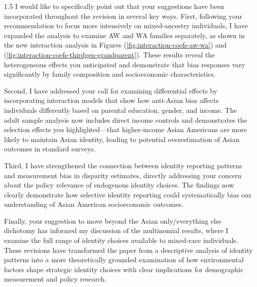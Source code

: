 \documentclass[12pt,english]{article}
\newcommand{\rrxspc}{1.5}
\begin{document}
\begin{refsection}
\begin{spacing}{\rrxspc}
        I would like to specifically point out that your suggestions have been incorporated throughout the revision in several key ways. First, following your recommendation to focus more intensively on mixed-ancestry individuals, I have expanded the analysis to examine AW and WA families separately, as shown in the new interaction analysis in Figures (\ref{fig:interaction-coefs-aw-wa}) and (\ref{fig:interaction-coefs-thirdgen-grandparent}). These results reveal the heterogeneous effects you anticipated and demonstrate that bias responses vary significantly by family composition and socioeconomic characteristics.
        
        Second, I have addressed your call for examining differential effects by incorporating interaction models that show how anti-Asian bias affects individuals differently based on parental education, gender, and income. The adult sample analysis now includes direct income controls and demonstrates the selection effects you highlighted—that higher-income Asian Americans are more likely to maintain Asian identity, leading to potential overestimation of Asian outcomes in standard surveys.
        
        Third, I have strengthened the connection between identity reporting patterns and measurement bias in disparity estimates, directly addressing your concern about the policy relevance of endogenous identity choices. The findings now clearly demonstrate how selective identity reporting could systematically bias our understanding of Asian American socioeconomic outcomes.
        
        Finally, your suggestion to move beyond the Asian only/everything else dichotomy has informed my discussion of the multinomial results, where I examine the full range of identity choices available to mixed-race individuals. These revisions have transformed the paper from a descriptive analysis of identity patterns into a more theoretically grounded examination of how environmental factors shape strategic identity choices with clear implications for demographic measurement and policy research.
    \end{spacing}

    \end{refsection}

\clearpage
\pagebreak
\end{document}
